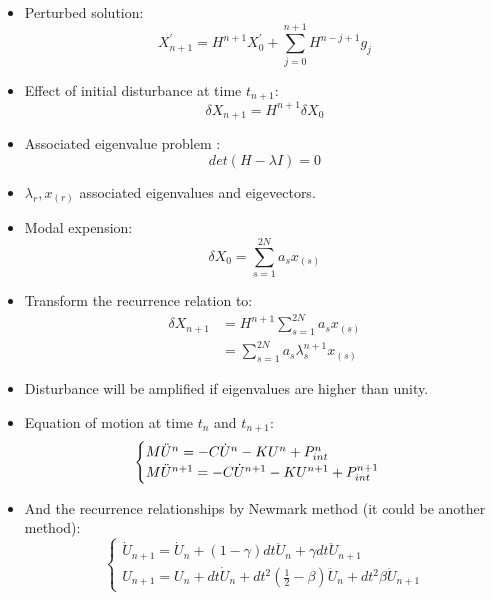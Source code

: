 \begin{frame}
\begin{itemize}
\item Perturbed solution:
\begin{equation}
X^\prime_{n+1} = H^{n+1}X_0^\prime + \sum^{n+1}_{j=0} H^{n-j+1}g_j
\end{equation}
\item Effect of initial disturbance at time $t_{n+1}$:
\begin{equation}
\delta X_{n+1} = H^{n+1} \delta X_0
\end{equation}
\item Associated eigenvalue problem :
\begin{equation}
det(H-\lambda I) = 0
\end{equation}
\item $\lambda_r, x_{(r)}$ associated eigenvalues and eigevectors.
\end{itemize}
\end{frame}
\begin{frame}
\begin{itemize}
\item Modal expension:
\begin{equation}
\delta X_0 = \sum^{2N}_{s=1} a_s x_{(s)}
\end{equation}
\item Transform the recurrence relation to:
\begin{align}
\delta X_{n+1} &= H^{n+1} \sum^{2N}_{s=1} a_s x_{(s)} \\
&= \sum^{2N}_{s=1} a_s \lambda_s^{n+1} x_{(s)}
\end{align} 
\item Disturbance will be amplified if eigenvalues are higher than unity.
\end{itemize}
\end{frame}

\begin{frame}
\begin{itemize}
\item Equation of motion at time $t_{n}$ and $t_{n+1}$:
\begin{equation}
\begin{cases}
    M  \Ddot{U}^n = -C \Dot{U}^n - K U^n +P_{int}^n \\
    M \Ddot{U}^{n+1} = -C \Dot{U}^{n+1} - K U^{n+1} +P_{int}^{n+1} 
\end{cases}
\end{equation}
\item And the recurrence relationships by Newmark method (it could be another method):
\begin{equation}
\begin{cases}
\dot{U}_{n+1} = \dot{U}_n + (1-\gamma)dt \ddot{U}_n + \gamma dt \ddot{U}_{n+1} \\
U_{n+1} = U_n +dt \dot{U}_n + dt^2 \left(\frac{1}{2}-\beta\right) \ddot{U}_n + dt^2 \beta \ddot{U}_{n+1}
\end{cases}
\end{equation}
\end{itemize}
\end{frame}



